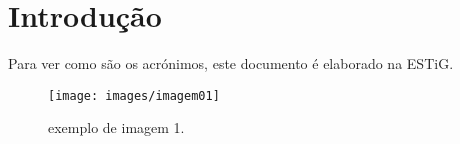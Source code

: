 \chapter{Introdução}\label{cap:intro}

Para ver como são os acrónimos, este documento é elaborado na \gls{ESTiG}.

\lipsum[1-3]

\begin{figure}[htbp]
    \begin{center}
    \texttt{[image: images/imagem01]}
    \end{center}
    \caption{exemplo de imagem 1.}
    \label{fig:graficosubscricoesmoveis}
\end{figure}

